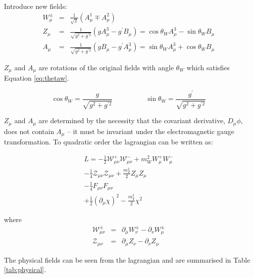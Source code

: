 Introduce new fields:
\begin{eqnarray}
W_{\mu}^{\pm} &=& \frac{1}{\sqrt{2}}(A_{\mu}^{1} \mp A_{\mu}^{2}) \\
Z_{\mu} &=& \frac{1}{\sqrt{g^{2} + g^{\prime 2}}}(gA_{\mu}^{3} -
g^{\prime}B_{\mu}) = \cos\theta_{W}A_{\mu}^{3} - \sin\theta_{W}B_{\mu} \\
A_{\mu} &=& \frac{1}{\sqrt{g^{2} + g^{\prime 2}}}(gB_{\mu} -
g^{\prime}A_{\mu}^{3}) = \sin\theta_{W}A_{\mu}^{3} + \cos\theta_{W}B_{\mu}
\end{eqnarray}

$Z_{\mu}$ and $A_{\mu}$ are rotations of the original fields with angle
$\theta_{W}$ which satisfies Equation \ref{eq:thetaw}.

\begin{equation}
\cos\theta_{W} = \frac{g}{\sqrt{g^{2} + g^{\prime 2}}} \hspace{2cm}
\sin\theta_{W} = \frac{g^{\prime}}{\sqrt{g^{2} + g^{\prime 2}}}
\label{eq:thetaw}
\end{equation}

$Z_{\mu}$ and $A_{\mu}$ are determined by the necessity that the covariant
derivative, $D_{\mu}\phi$, does not contain $A_{\mu}$ -- it must be invariant
under the electromagnetic gauge transformation. To quadratic order the
lagrangian can be written as:  

\begin{eqnarray}
L = -\frac{1}{2}\mathcal{W}_{\mu\nu}^{+}\mathcal{W}_{\mu\nu}^{-} + 
m_{W}^{2}W_{\mu}^{+}W_{\mu}^{-} \\
-\frac{1}{4}\mathcal{Z}_{\mu\nu}\mathcal{Z}_{\mu\nu} + 
\frac{m_{Z}^{2}}{2}Z_{\mu}Z_{\mu} \\
-\frac{1}{4}F_{\mu\nu}F_{\mu\nu} \\
+\frac{1}{2}(\partial_{\mu}\chi)^{2} - \frac{m_{\chi}^{2}}{2}\chi^{2}
\end{eqnarray}

where
\begin{eqnarray}
\mathcal{W}_{\mu\nu}^{\pm} &=& \partial_{\mu}W_{\nu}^{\pm} -
\partial_{\nu}W_{\mu}^{\pm} \\
\mathcal{Z}_{\mu\nu} &=& \partial_{\mu}Z_{\nu} - \partial_{\nu}Z_{\mu}
\end{eqnarray}

The physical fields can be seen from the lagrangian and are summarised in Table
\ref{tab:physical}. \\

